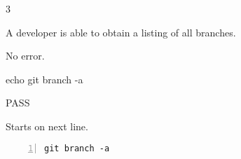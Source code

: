 \begin{description}[align=right,leftmargin=3.2cm,labelindent=3.0cm]
\item[Step:] 3
\item[Confirm:] A developer is able to obtain a listing of all branches.
\item[Expectation:] No error.
\item[Command:] echo git  branch -a
\item[Test Result:] PASS
\item[Evidence:] Starts on next line.
\end{description}
\begin{lstlisting}[numbers=left]
git branch -a

\end{lstlisting}
